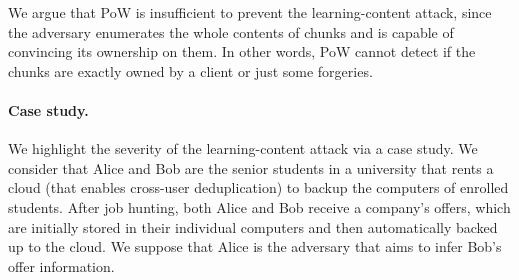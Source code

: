 We argue that PoW \cite{halevi11}  is insufficient to prevent the learning-content attack, since the adversary enumerates the whole contents of chunks and is capable of convincing its ownership on them. In other words, PoW cannot detect if the chunks are exactly owned by a client or just some forgeries.










\paragraph{Case study.}
We highlight the severity of the learning-content attack via a case study. We consider that Alice and Bob are the senior students in a university that rents a cloud (that enables cross-user deduplication) to backup the computers of enrolled students. After job hunting, both Alice and Bob receive a company's offers, which are initially stored in their individual computers and then automatically backed up to the cloud.
We suppose that Alice is the adversary that aims to infer Bob's offer information. %




